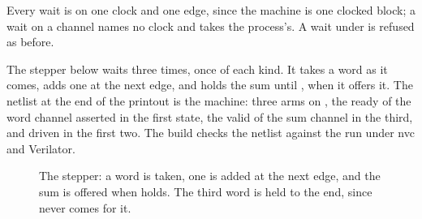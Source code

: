 Every wait is on one clock and one edge, since the machine is one
clocked block; a wait on a channel names no clock and takes the
process's. A wait under  is refused as before.

The stepper below waits three times, once of each kind. It takes a
word as it comes, adds one at the next edge, and holds the sum until
, when it offers it. The netlist at the end of the printout
is the machine: three arms on , the ready of the word
channel asserted in the first state, the valid of the sum channel in
the third, and  driven in the first two. The build checks
the netlist against the run under nvc and Verilator.

\begin{figure}[htbp]
\centering

\caption{The stepper: a word is taken, one is added at the next
edge, and the sum is offered when  holds. The third word
is held to the end, since  never comes for it.}
\label{fig:x-seq}
\end{figure}





